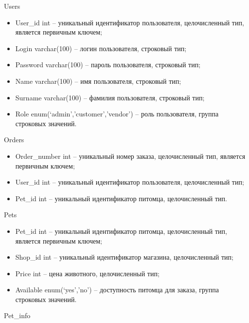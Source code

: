 Users

\begin{itemize}
  \item User\_id int – уникальный идентификатор пользователя, целочисленный тип, является первичным ключем;
  \item Login varchar(100) – логин пользователя, строковый тип;
  \item Password varchar(100) – пароль пользователя, строковый тип;
  \item Name varchar(100) – имя пользователя, строковый тип;
  \item Surname varchar(100) – фамилия пользователя, строковый тип;
  \item Role enum(‘admin’,’customer’,’vendor’) – роль пользователя, группа строковых значений.
\end{itemize}

Orders

\begin{itemize}
  \item Order\_number int – уникальный номер заказа,  целочисленный тип, является первичным ключем;
  \item User\_id int – уникальный идентификатор пользователя, целочисленный тип;
  \item Pet\_id int – уникальный идентификатор питомца, целочисленный тип.
\end{itemize}

Pets

\begin{itemize}
  \item Pet\_id int – уникальный идентификатор питомца, целочисленный тип, является первичным ключем;
  \item Shop\_id int – уникальный идентификатор магазина, целочисленный тип;
  \item Price int – цена животного, целочисленный тип;
  \item Available enum(‘yes’,’no’) – доступность питомца для заказа, группа строковых значений.
\end{itemize}

Pet\_info

